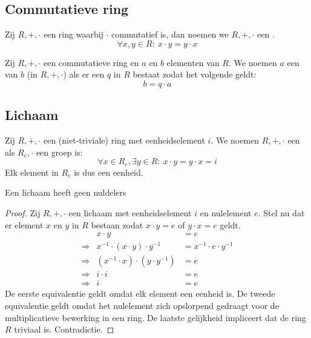 \documentclass[main.tex]{subfiles}
\begin{document}
\subsection{Commutatieve ring}
\label{sec:commutatieve-rin}

\begin{de}
  Zij $R,+,\cdot$ een ring waarbij $\cdot$ commutatief is, dan noemen we $R,+,\cdot$ een .
  \[ \forall x,y \in R:\ x\cdot y = y \cdot x \]
\end{de}

\begin{de}
  Zij $R,+,\cdot$ een commutatieve ring en $a$ en $b$ elementen van $R$.
  We noemen $a$ een  van $b$ (in $R,+,\cdot$) als er een $q$ in $R$ bestaat zodat het volgende geldt:
  \[ b = q \cdot a \]
\end{de}

\subsection{Lichaam}
\label{sec:lichaam}

\begin{de}
  Zij $R,+,\cdot$ een (niet-triviale) ring met eenheidselement $i$.
  We noemen $R,+,\cdot$ een  als $R_{e},\cdot$ een groep is:
  \[ \forall x \in R_{e}, \exists y \in R:\ x\cdot y = y \cdot x = i \]
  Elk element in $R_{e}$ is dus een eenheid.
\end{de}

\begin{st}
  \label{st:lichaam-geen-nuldelers}
  Een lichaam heeft geen nuldelers

  \begin{proof}
    Zij $R,+,\cdot$ een lichaam met eenheidselement $i$ en nulelement $e$.
    Stel nu dat er element $x$ en $y$ in $R$ bestaan zodat $x\cdot y = e$ of $y \cdot x = e$ geldt.
    \[
    \begin{array}{rrl}
      & x \cdot y &= e\\
      \Rightarrow & x^{-1} \cdot (x \cdot y) \cdot y^{-1} &= x^{-1} \cdot e \cdot y^{-1}\\
      \Rightarrow & (x^{-1} \cdot x) \cdot (y \cdot y^{-1}) &= e\\
      \Rightarrow & i \cdot i &= e\\
      \Rightarrow & i &= e
    \end{array}
    \]
    De eerste equivalentie geldt omdat elk element een eenheid is.
    De tweede equivalentie geldt omdat het nulelement zich opslorpend gedraagt voor de multiplicatieve bewerking in een ring.
    De laatste gelijkheid impliceert dat de ring $R$ triviaal is.
    Contradictie.
  \end{proof}
\end{st}
\end{document}
